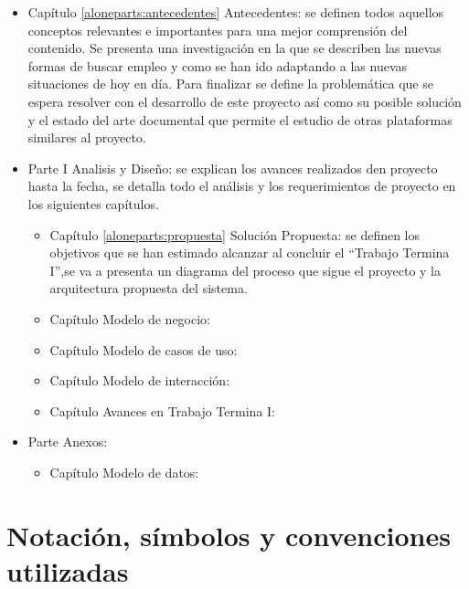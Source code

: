 	\begin{itemize}
		
		\item Capítulo \ref{aloneparts:antecedentes} Antecedentes:
		se definen todos aquellos conceptos relevantes e importantes para una mejor comprensión del contenido. 
		Se presenta una investigación en la que se describen las nuevas formas de buscar empleo y como se han ido adaptando 
		a las nuevas situaciones de hoy en día. Para finalizar se define la problemática que se espera resolver con el desarrollo 
		de este proyecto así como su posible solución y el estado del arte documental que permite el estudio de otras plataformas 
		similares al proyecto.
		
		
		
		\item Parte I Analisis y Diseño: 
		se explican los avances realizados den proyecto hasta la fecha, se detalla todo el análisis y los 
		requerimientos de proyecto en los siguientes capítulos.

			\begin{itemize}
				\item Capítulo \ref{aloneparts:propuesta} Solución Propuesta: 
				se definen los objetivos que se han estimado alcanzar al concluir el ``Trabajo Termina I'',se va a presenta un diagrama
				del proceso que sigue el proyecto y la arquitectura propuesta del sistema.

				\item Capítulo  Modelo de negocio: 

				\item Capítulo Modelo de casos de uso: 

				\item Capítulo  Modelo de interacción: 

				\item Capítulo Avances en Trabajo Termina I: 
			\end{itemize}

		

		\item Parte  Anexos: 
			\begin{itemize}
				\item Capítulo Modelo de datos: 
			\end{itemize}
	\end{itemize}


\section{Notación, símbolos y convenciones utilizadas}

